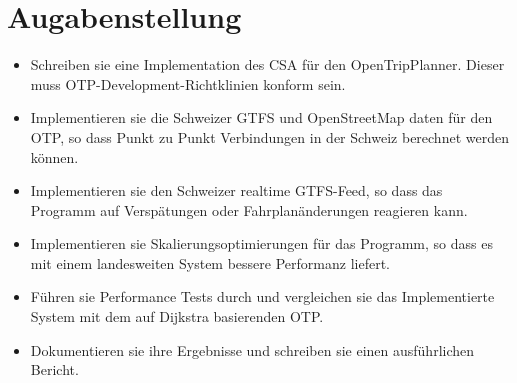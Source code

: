 \section{Augabenstellung}
\label{AufgabenstellungBA}
\begin{itemize}
	\item Schreiben sie eine Implementation des CSA für den OpenTripPlanner. Dieser muss OTP-Development-Richtklinien konform sein.
	\item Implementieren sie die Schweizer GTFS und OpenStreetMap daten für den OTP, so dass Punkt zu Punkt Verbindungen in der Schweiz berechnet werden können.
	\item Implementieren sie den Schweizer realtime GTFS-Feed, so dass das Programm auf Verspätungen oder Fahrplanänderungen reagieren kann.
	\item Implementieren sie Skalierungsoptimierungen für das Programm, so dass es mit einem landesweiten System bessere Performanz liefert.
	\item Führen sie Performance Tests durch und vergleichen sie das Implementierte System mit dem auf Dijkstra basierenden OTP.
	\item Dokumentieren sie ihre Ergebnisse und schreiben sie einen ausführlichen Bericht.
\end{itemize}

